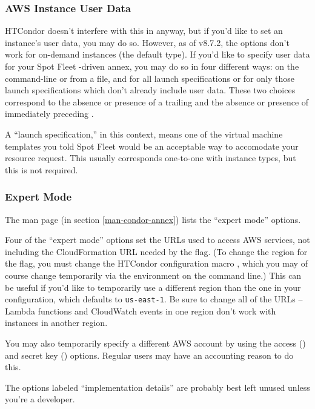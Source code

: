 \subsubsection{AWS Instance User Data}

HTCondor doesn't interfere with this in anyway, but if you'd like to set
an instance's user data, you may do so.  However, as of v8.7.2, the
 options don't work for on-demand instances (the default
type).  If you'd like to specify user data for your Spot Fleet -driven
annex, you may do so in four different ways: on the command-line or
from a file, and for all launch specifications or for only those launch
specifications which don't already include user data.  These two choices
correspond to the absence or presence of a trailing  and the
absence or presence of  immediately preceding .

A ``launch specification,'' in this context, means one of the virtual machine
templates you told Spot Fleet would be an acceptable way to accomodate your
resource request.  This usually corresponds one-to-one with instance types,
but this is not required.

\subsubsection{Expert Mode}

The man page (in section \ref{man-condor-annex}) lists the ``expert
mode'' options.

Four of the ``expert mode'' options set the URLs used to access AWS services,
not including the CloudFormation URL needed by the  flag.  (To
change the region for the  flag, you must change the HTCondor
configuration macro , which you may of
course change temporarily via the environment on the command line.)  This
can be useful if you'd like to temporarily use a different region than the
one in your configuration, which defaults to {\tt us-east-1}.  Be sure to
change all of the URLs -- Lambda functions and CloudWatch events in one
region don't work with instances in another region.


You may also temporarily specify a different AWS account by using the
access () and
secret key () options.  Regular users may have
an accounting reason to do this.

The options labeled ``implementation details'' are probably best left
unused unless you're a developer.

